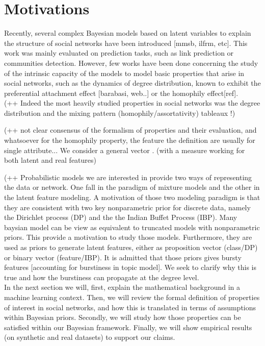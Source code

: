 \section{Motivations}
Recently, several complex Bayesian models based on latent variables to explain the structure of social networks have been introduced [mmsb, ilfrm, etc]. This work was mainly evaluated on prediction tasks, such as link prediction or communities detection. However, few works have been done concerning the study of the intrinsic capacity of the models to model basic properties that arise in social networks, such as the dynamics of degree distribution, known to exhibit the preferential attachment effect [barabasi, web..] or the homophily effect[ref].
~\\


(++ Indeed the most heavily studied properties in social networks was the degree distribution and the mixing pattern (homophily/assortativity) tableaux !)

(++ not clear consensus of the formalism of properties and their evaluation, and whatsoever for the homophily property, the feature the definition are usually for single attribute... We consider a general vector . (with a measure working for both latent and real features)

(++ Probabilistic models we are interested in provide two ways of representing the data or network. One fall in the paradigm of mixture models and the other in the latent feature modeling. A motivation of those two modeling paradigm is that they are consistent with two key nonparametric prior for discrete data, namely the Dirichlet process (DP) and the the Indian Buffet Process (IBP). Many baysian model can be view as equivalent to truncated models with nonparametric priors. This provide a motivation to study those models. Furthermore, they are used as priors to generate latent features, either as proposition vector (class/DP) or binary vector (feature/IBP). It is admitted that those priors gives bursty features [accounting for burstiness in topic model]. We seek to clarify why this is true and how the burstiness can propagate at the degree level.~\\


In the next section we will, first, explain the mathematical background in a machine learning context. Then, we will review the formal definition of properties of interest in social networks, and how this is translated in terms of assumptions within Bayesian priors. Secondly, we will study how those properties can be satisfied within our Bayesian framework. Finally, we will show empirical results (on synthetic and real datasets) to support our claims.~\\


